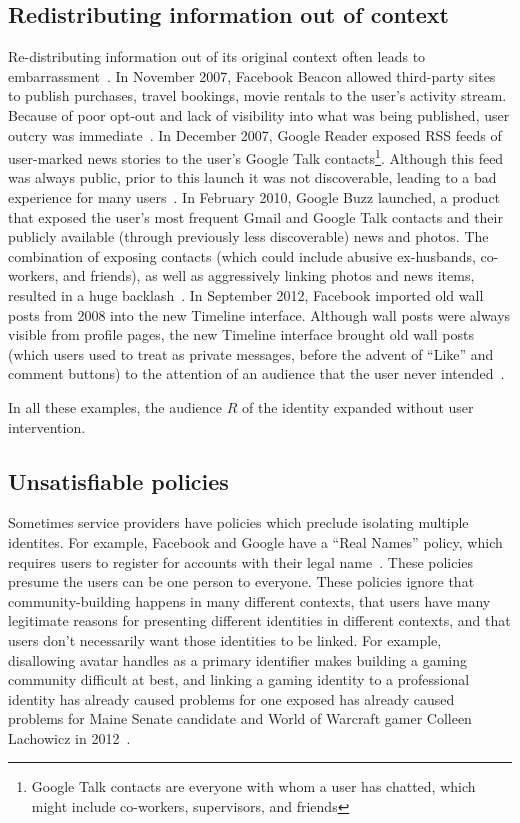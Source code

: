\documentclass{llncs}
\begin{document}
\subsection{Redistributing information out of context}
Re-distributing information out of its original context often leads to
embarrassment~\cite{nissenbaum}.  In November 2007, Facebook Beacon allowed
third-party sites to publish purchases, travel bookings, movie rentals to the
user's activity stream.  Because of poor opt-out and lack of visibility into
what was being published, user outcry was immediate~\cite{mccarthy,nakashima}.
In December 2007, Google Reader exposed RSS feeds of user-marked news stories
to the user's Google Talk contacts\footnote{Google Talk contacts are everyone
with whom a user has chatted, which might include co-workers, supervisors, and
friends}. Although this feed was always public, prior to this launch it was not
discoverable, leading to a bad experience for many users~\cite{helft}. In
February 2010, Google Buzz launched, a product that
exposed the user's most frequent Gmail and Google Talk contacts and their
publicly available (through previously less discoverable) news and photos.  The
combination of exposing contacts (which could include abusive ex-husbands,
co-workers, and friends), as well as aggressively linking photos and news
items, resulted in a huge backlash~\cite{fugitivus,buzz}. In September 2012,
Facebook imported old wall posts from 2008 into the new Timeline interface.
Although wall posts were always visible from profile pages, the new Timeline
interface brought old wall posts (which users used to treat as private
messages, before the advent of ``Like'' and comment buttons) to the attention
of an audience that the user never intended~\cite{timeline}.

In all these examples, the audience $R$ of the identity expanded without user
intervention.

\subsection{Unsatisfiable policies}
Sometimes service providers have policies which preclude isolating multiple
identites. For example, Facebook and Google have a ``Real Names'' policy, which
requires users to register for accounts with their legal
name~\cite{fb_names,google_names}.  These policies presume the users can be one
person to everyone. These policies ignore that community-building happens in
many different contexts, that users have many legitimate reasons for presenting
different identities in different contexts, and that users don't necessarily
want those identities to be linked. For example, disallowing avatar handles as
a primary identifier makes building a gaming community difficult at best, and
linking a gaming identity to a professional identity has already caused
problems for one exposed has already caused problems for Maine Senate candidate
and World of Warcraft gamer Colleen Lachowicz in 2012~\cite{maine}.
\end{document}
